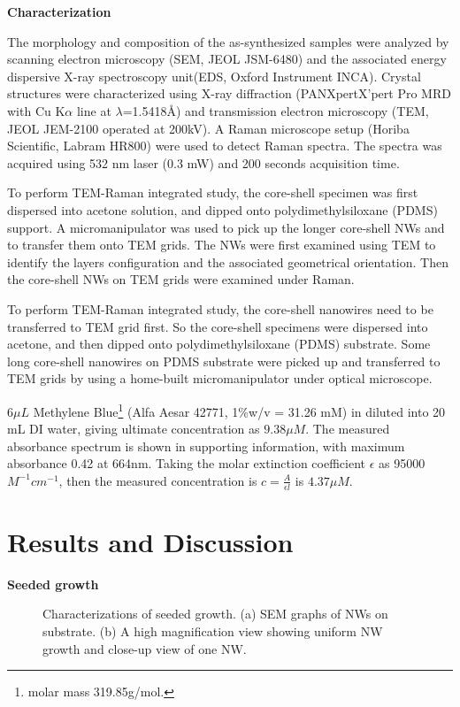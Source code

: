 \documentclass[11pt]{article} %
\begin{document}
\textbf{Characterization}

The morphology and composition of the as-synthesized samples were analyzed by scanning electron microscopy (SEM, JEOL JSM-6480) and the associated energy dispersive X-ray spectroscopy unit(EDS, Oxford Instrument INCA). Crystal structures were characterized using X-ray diffraction (PANXpertX’pert Pro MRD with Cu K$\alpha$ line at $\lambda$=1.5418\AA) and transmission electron microscopy (TEM, JEOL JEM-2100  operated at 200kV). A Raman microscope setup (Horiba Scientific, Labram HR800) were used to detect Raman spectra. The spectra was acquired using 532 nm laser (0.3 mW) and 200 seconds acquisition time.

To perform TEM-Raman integrated study, the core-shell specimen was first dispersed into acetone solution, and dipped onto polydimethylsiloxane (PDMS) support. A micromanipulator was used to pick up the longer core-shell NWs and to transfer them onto TEM grids. The NWs were first examined using TEM to identify the  layers configuration and the associated geometrical orientation. Then the core-shell NWs on TEM grids were examined under Raman.

To perform TEM-Raman integrated study, the core-shell nanowires need to be transferred to TEM grid first. So the core-shell specimens were dispersed into acetone, and then dipped onto polydimethylsiloxane (PDMS) substrate. Some long core-shell nanowires on PDMS substrate were picked up and transferred to TEM grids by using a home-built micromanipulator under optical microscope.

$6\mu L$ Methylene Blue\footnote{ molar mass 319.85g/mol.} (Alfa Aesar 42771, 1\%w/v = 31.26 mM) in diluted into 20 mL DI water, giving ultimate concentration as $9.38 \mu M$. The measured absorbance spectrum is shown in supporting information, with maximum absorbance 0.42 at 664nm. Taking the  molar extinction coefficient $\epsilon$ as 95000 $M^{-1}cm^{-1}$,\cite{Cenens1988} then the measured concentration is $c = \frac{A}{\epsilon l}$ is $4.37 \mu M$.


\section{Results and Discussion}

\textbf{Seeded growth}

\begin{figure}[htb]
\centering
{}\hspace{0.04\textwidth}
\caption[Characterization of seeded growth : SEM]{Characterizations of seeded growth. (a) SEM graphs of  NWs on  substrate. (b) A high magnification view showing uniform NW growth and close-up view of one NW. }
\label{fig:woseedsem}
\end{figure}
\end{document}
